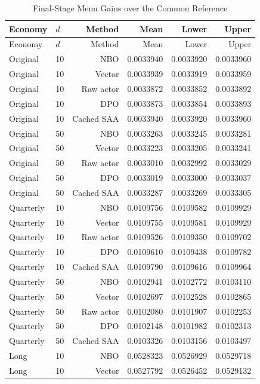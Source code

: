 \begin{longtable}{llrrrr}
\caption{Final-Stage Menu Gains over the Common Reference}\label{tab:r16menugains}\\
\toprule
Economy & $d$ & Method & Mean & Lower & Upper \\
\midrule
\endfirsthead
\toprule
Economy & $d$ & Method & Mean & Lower & Upper \\
\midrule\endhead
Original & 10 & NBO & 0.0033940 & 0.0033920 & 0.0033960 \\
Original & 10 & Vector & 0.0033939 & 0.0033919 & 0.0033959 \\
Original & 10 & Raw actor & 0.0033872 & 0.0033852 & 0.0033892 \\
Original & 10 & DPO & 0.0033873 & 0.0033854 & 0.0033893 \\
Original & 10 & Cached SAA & 0.0033940 & 0.0033920 & 0.0033960 \\
Original & 50 & NBO & 0.0033263 & 0.0033245 & 0.0033281 \\
Original & 50 & Vector & 0.0033223 & 0.0033205 & 0.0033241 \\
Original & 50 & Raw actor & 0.0033010 & 0.0032992 & 0.0033029 \\
Original & 50 & DPO & 0.0033019 & 0.0033000 & 0.0033037 \\
Original & 50 & Cached SAA & 0.0033287 & 0.0033269 & 0.0033305 \\
Quarterly & 10 & NBO & 0.0109756 & 0.0109582 & 0.0109929 \\
Quarterly & 10 & Vector & 0.0109755 & 0.0109581 & 0.0109929 \\
Quarterly & 10 & Raw actor & 0.0109526 & 0.0109350 & 0.0109702 \\
Quarterly & 10 & DPO & 0.0109610 & 0.0109438 & 0.0109782 \\
Quarterly & 10 & Cached SAA & 0.0109790 & 0.0109616 & 0.0109964 \\
Quarterly & 50 & NBO & 0.0102941 & 0.0102772 & 0.0103110 \\
Quarterly & 50 & Vector & 0.0102697 & 0.0102528 & 0.0102865 \\
Quarterly & 50 & Raw actor & 0.0102080 & 0.0101907 & 0.0102253 \\
Quarterly & 50 & DPO & 0.0102148 & 0.0101982 & 0.0102313 \\
Quarterly & 50 & Cached SAA & 0.0103326 & 0.0103156 & 0.0103497 \\
Long & 10 & NBO & 0.0528323 & 0.0526929 & 0.0529718 \\
Long & 10 & Vector & 0.0527792 & 0.0526452 & 0.0529132 \\

\end{longtable}
